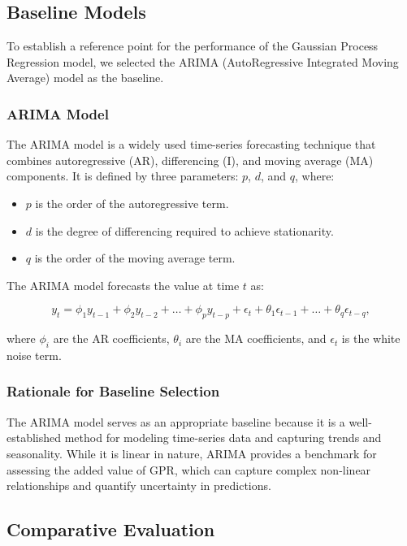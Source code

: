 \subsection{Baseline Models}

To establish a reference point for the performance of the Gaussian Process Regression model, we selected the ARIMA (AutoRegressive Integrated Moving Average) model as the baseline.

\subsubsection{\ac{ARIMA} Model}

The \ac{ARIMA} model is a widely used time-series forecasting technique that combines autoregressive (AR), differencing (I), and moving average (MA) components. It is defined by three parameters: $p$, $d$, and $q$, where:

\begin{itemize}
    \item $p$ is the order of the autoregressive term.
    \item $d$ is the degree of differencing required to achieve stationarity.
    \item $q$ is the order of the moving average term.
\end{itemize}

The \ac{ARIMA} model forecasts the value at time $t$ as:

\begin{equation}
y_t = \phi_1 y_{t-1} + \phi_2 y_{t-2} + \dots + \phi_p y_{t-p} + \epsilon_t + \theta_1 \epsilon_{t-1} + \dots + \theta_q \epsilon_{t-q},
\end{equation}

where $\phi_i$ are the AR coefficients, $\theta_i$ are the MA coefficients, and $\epsilon_t$ is the white noise term.

\subsubsection{Rationale for Baseline Selection}

The \ac{ARIMA} model serves as an appropriate baseline because it is a well-established method for modeling time-series data and capturing trends and seasonality. While it is linear in nature, ARIMA provides a benchmark for assessing the added value of GPR, which can capture complex non-linear relationships and quantify uncertainty in predictions.

\subsection{Comparative Evaluation}

